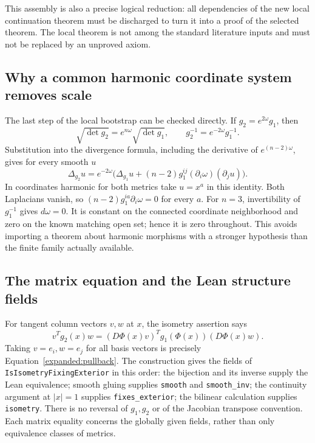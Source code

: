 \documentclass[11pt]{article}
\theoremstyle{definition}
\theoremstyle{remark}
\numberwithin{equation}{section}
\begin{document}
This assembly is also a precise logical reduction: all dependencies of
the new local continuation theorem must be discharged to turn it into
a proof of the selected theorem. The local theorem is not among the
standard literature inputs and must not be replaced by an unproved axiom.

\subsection{Why a common harmonic coordinate system removes scale}
The last step of the local bootstrap can be checked directly. If
$g_2=e^{2\omega}g_1$, then
\[
 \sqrt{\det g_2}=e^{n\omega}\sqrt{\det g_1},\qquad
 g_2^{-1}=e^{-2\omega}g_1^{-1}.
\]
Substitution into the divergence formula, including the derivative of
$e^{(n-2)\omega}$, gives for every smooth $u$
\begin{equation}\label{expanded:conformal-laplacian}
 \Delta_{g_2}u=e^{-2\omega}
 \bigl(\Delta_{g_1}u+(n-2)g_1^{ij}(\partial_i\omega)
                                      (\partial_j u)\bigr).
\end{equation}
In coordinates harmonic for both metrics take $u=x^a$ in this identity.
Both Laplacians vanish, so $(n-2)g_1^{ia}\partial_i\omega=0$ for
every $a$. For $n=3$, invertibility of $g_1^{-1}$ gives $d\omega=0$.
It is constant on the connected coordinate neighborhood and zero on
the known matching open set; hence it is zero throughout. This avoids
importing a theorem about harmonic morphisms with a stronger hypothesis
than the finite family actually available.

\subsection{The matrix equation and the Lean structure fields}
For tangent column vectors $v,w$ at $x$, the isometry assertion says
\[
 v^Tg_2(x)w=(D\Phi(x)v)^Tg_1(\Phi(x))(D\Phi(x)w).
\]
Taking $v=e_i,w=e_j$ for all basis vectors is precisely
Equation~\eqref{expanded:pullback}. The construction gives the fields
of \texttt{IsIsometryFixingExterior} in this order: the bijection and
its inverse supply the Lean equivalence; smooth gluing supplies
\texttt{smooth} and \texttt{smooth\_inv}; the continuity argument at
$|x|=1$ supplies \texttt{fixes\_exterior}; the bilinear calculation
supplies \texttt{isometry}. There is no reversal of $g_1,g_2$ or of
the Jacobian transpose convention. Each matrix equality concerns the
globally given fields, rather than only equivalence classes of metrics.
\end{document}
